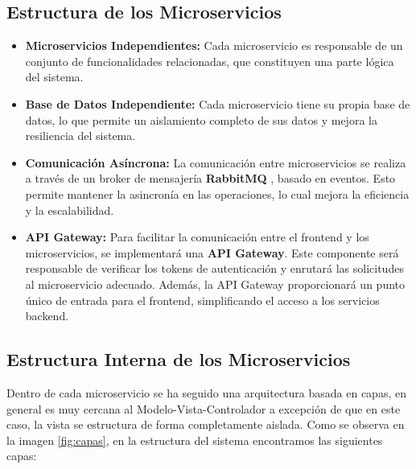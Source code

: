 \subsection{Estructura de los Microservicios}


\begin{itemize}
    \item \textbf{Microservicios Independientes:} Cada microservicio es responsable de un conjunto de funcionalidades relacionadas, que constituyen una parte lógica del sistema.
    \item \textbf{Base de Datos Independiente:} Cada microservicio tiene su propia base de datos, lo que permite un aislamiento completo de sus datos y mejora la resiliencia del sistema.
    \item \textbf{Comunicación Asíncrona:} La comunicación entre microservicios se realiza a través de un broker de mensajería \textbf{RabbitMQ} \cite{rabbitmq}, basado en eventos. Esto permite mantener la asincronía en las operaciones, lo cual mejora la eficiencia y la escalabilidad.
    \item \textbf{API Gateway:} Para facilitar la comunicación entre el frontend y los microservicios, se implementará una \textbf{API Gateway}. Este componente será responsable de verificar los tokens de autenticación y enrutará las solicitudes al microservicio adecuado. Además, la API Gateway proporcionará un punto único de entrada para el frontend, simplificando el acceso a los servicios backend.
\end{itemize}


\subsection{Estructura Interna de los Microservicios}
Dentro de cada microservicio se ha seguido una arquitectura basada en capas, en general es muy cercana al Modelo-Vista-Controlador a excepción de que en este caso, la vista se estructura de forma completamente aislada. Como se observa en la imagen \ref{fig:capas}, en la estructura del sistema encontramos las siguientes capas:

